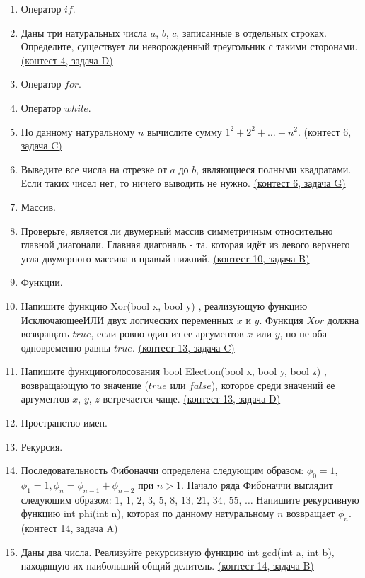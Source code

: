 \documentclass[a4paper,12pt]{article}
\begin{document}
\begin{enumerate}
\item Оператор $if$.
\item Даны три натуральных числа $a$, $b$, $c$, записанные в отдельных строках. Определите, существует ли неворожденный треугольник с такими сторонами. \href{https://informatics.msk.ru/mod/statements/view3.php?chapterid=295}{(контест 4, задача D)}
\item Оператор $for$.
\item Оператор $while$.
\item По данному натуральному $n$ вычислите сумму $1^2+2^2+\dots+n^2$. \href{https://informatics.msk.ru/mod/statements/view3.php?chapterid=315}{(контест 6, задача C)}
\item Выведите все числа на отрезке от $a$ до $b$, являющиеся полными квадратами. Если таких чисел нет, то ничего выводить не нужно. \href{https://informatics.msk.ru/mod/statements/view3.php?chapterid=335}{(контест 6, задача G)}
\item Массив.
\item Проверьте, является ли двумерный массив симметричным относительно главной диагонали. Главная диагональ - та, которая идёт из левого верхнего угла двумерного массива в правый нижний. \href{https://informatics.msk.ru/mod/statements/view3.php?chapterid=355}{(контест 10, задача B)}
\item Функции.
\item Напишите функцию Xor(bool x, bool y) {}, реализующую функцию $Исключающее ИЛИ$ двух логических переменных $x$ и $y$. Функция $Xor$ должна возвращать $true$, если ровно один из ее аргументов $x$ или $y$, но не оба одновременно равны $true$. \href{https://informatics.msk.ru/mod/statements/view3.php?chapterid=308}{(контест 13, задача C)}
\item Напишите $функцию голосования$ bool Election(bool x, bool y, bool z) {}, возвращающую то значение ($true$ или $false$), которое среди значений ее аргументов $x$, $y$, $z$ встречается чаще. \href{https://informatics.msk.ru/mod/statements/view3.php?chapterid=309}{(контест 13, задача D)}
\item Пространство имен.
\item Рекурсия.
\item Последовательность Фибоначчи определена следующим образом: $\phi_0=1$, $\phi_1=1, \phi_n=\phi_{n-1}+\phi_{n-2}$ при $n>1$. Начало ряда Фибоначчи выглядит следующим образом: $1$, $1$, $2$, $3$, $5$, $8$, $13$, $21$, $34$, $55$, $\dots$ Напишите рекурсивную функцию int phi(int n), которая по данному натуральному $n$ возвращает $\phi_n$. \href{https://informatics.msk.ru/mod/statements/view3.php?chapterid=312}{(контест 14, задача A)}
\item Даны два числа. Реализуйте рекурсивную функцию int gcd(int a, int b), находящую их наибольший общий делитель. \href{https://informatics.msk.ru/mod/statements/view3.php?chapterid=199}{(контест 14, задача B)}
\end{enumerate}
\end{document}
